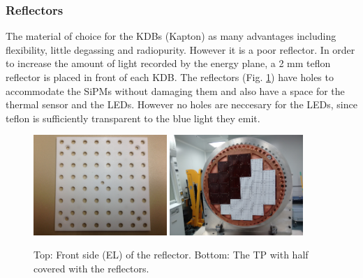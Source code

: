 \subsubsection*{Reflectors}

The material of choice for the KDBs (Kapton) as many advantages including flexibility, little degassing and radiopurity. However it is a poor reflector. In order to increase the amount of light recorded by the energy plane, a 2 mm teflon reflector is placed in front of each KDB. The reflectors (Fig. \ref{fig:reflector}) have holes to accommodate the SiPMs without damaging them and also have a space for the thermal sensor and the LEDs. However no holes are neccesary for the LEDs, since teflon is sufficiently transparent to the blue light they emit. 
\begin{figure}[hpt!]
\centering
\includegraphics[width=0.45\textwidth]{TrackingPlane/IMG/teflon2}
\includegraphics[width=0.45\textwidth]{img/TPMJ.png}

\caption{Top: Front side (EL) of the reflector. Bottom: The TP with half covered with the reflectors.}
\label{fig:reflector}
\end{figure}

